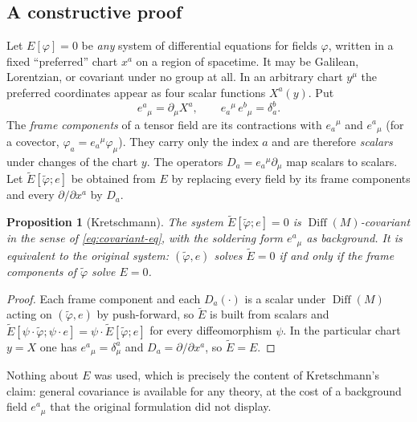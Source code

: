 \documentclass[11pt,a4paper,openany]{book}
\theoremstyle{definition}
\theoremstyle{plain}
\newtheorem{proposition}{Proposition}[chapter]
\theoremstyle{remark}
\DeclareMathOperator{\Diff}{Diff}
\begin{document}
\subsection{A constructive proof}

Let $E[\varphi]=0$ be \emph{any} system of differential equations for fields
$\varphi$, written in a fixed ``preferred'' chart $x^a$ on a region of
spacetime. It may be Galilean, Lorentzian, or covariant under no group at all.
In an arbitrary chart $y^\mu$ the preferred coordinates appear as four scalar
functions $X^a(y)$. Put
\begin{equation}\label{eq:soldering}
  e^a{}_\mu=\partial_\mu X^a,\qquad
  e_a{}^\mu\,e^b{}_\mu=\delta_a^b .
\end{equation}
The \emph{frame components} of a tensor field are its contractions with
$e_a{}^\mu$ and $e^a{}_\mu$ (for a covector, $\varphi_a=e_a{}^\mu\varphi_\mu$).
They carry only the index $a$ and are therefore \emph{scalars} under changes
of the chart $y$. The operators $D_a=e_a{}^\mu\partial_\mu$ map scalars to
scalars. Let $\tilde E[\tilde\varphi;e]$ be obtained from $E$ by replacing every
field by its frame components and every $\partial/\partial x^a$ by $D_a$.

\begin{proposition}[Kretschmann]\label{prop:kretschmann}
The system $\tilde E[\tilde\varphi;e]=0$ is $\Diff(M)$-covariant in the sense
of \eqref{eq:covariant-eq}, with the soldering form $e^a{}_\mu$ as background.
It is equivalent to the original system: $(\tilde\varphi,e)$ solves
$\tilde E=0$ if and only if the frame components of $\tilde\varphi$ solve
$E=0$.
\end{proposition}
\begin{proof}
Each frame component and each $D_a(\cdot)$ is a scalar under $\Diff(M)$ acting
on $(\tilde\varphi,e)$ by push-forward, so $\tilde E$ is built from scalars
and $\tilde E[\psi\!\cdot\!\tilde\varphi;\psi\!\cdot\! e]
=\psi\!\cdot\!\tilde E[\tilde\varphi;e]$ for every diffeomorphism $\psi$. In the
particular chart $y=X$ one has $e^a{}_\mu=\delta^a_\mu$ and $D_a=\partial/\partial x^a$,
so $\tilde E=E$. \qedhere
\end{proof}

Nothing about $E$ was used, which is precisely the content of Kretschmann's
claim: general covariance is available for any theory, at the cost of a
background field $e^a{}_\mu$ that the original formulation did not display.
\end{document}
